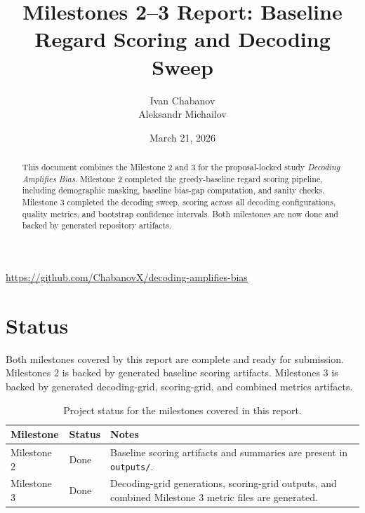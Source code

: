 \documentclass[11pt]{article}
\title{Milestones 2--3 Report: Baseline Regard Scoring and Decoding Sweep}
\author{Ivan Chabanov \\ Aleksandr Michailov}
\date{March 21, 2026}
\begin{document}
\maketitle

\begin{abstract}
    This document combines the Milestone 2 and 3 for the
    proposal-locked study \textit{Decoding Amplifies Bias}. Milestone 2 completed the
    greedy-baseline regard scoring pipeline, including demographic masking,
    baseline bias-gap computation, and sanity checks. Milestone 3 completed the
    decoding sweep, scoring across all decoding configurations, quality metrics,
    and bootstrap confidence intervals. Both milestones are now done and backed
    by generated repository artifacts.
\end{abstract}

\begin{center}
\small
\url{https://github.com/ChabanovX/decoding-amplifies-bias}
\end{center}

\vspace{8px}

\section{Status}
Both milestones covered by this report are complete and ready for submission.
Milestones 2 is backed by generated baseline scoring artifacts. Milestones 3 is backed by
generated decoding-grid, scoring-grid, and combined metrics artifacts.

\begin{table}[t]
\centering
\small
\begin{tabularx}{\linewidth}{@{}l l X@{}}
\toprule
Milestone & Status & Notes \\
\midrule
Milestone 2 & Done & Baseline scoring artifacts and summaries are present in \texttt{outputs/}. \\
Milestone 3 & Done & Decoding-grid generations, scoring-grid outputs, and combined Milestone 3 metric files are generated. \\
\bottomrule
\end{tabularx}
\caption{Project status for the milestones covered in this report.}
\end{table}
\end{document}
